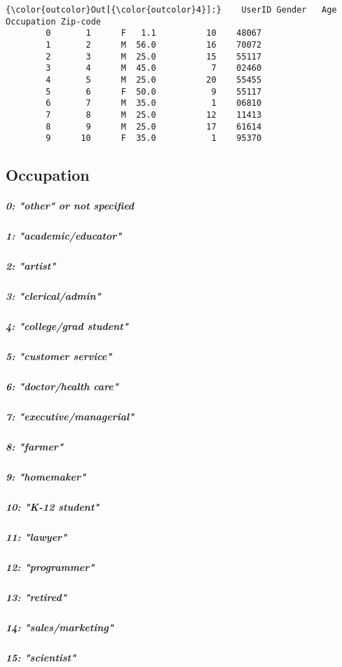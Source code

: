 \documentclass[11pt]{article}
\begin{document}
\begin{Verbatim}[commandchars=\\\{\}]
{\color{outcolor}Out[{\color{outcolor}4}]:}    UserID Gender   Age  Occupation Zip-code
        0       1      F   1.1          10    48067
        1       2      M  56.0          16    70072
        2       3      M  25.0          15    55117
        3       4      M  45.0           7    02460
        4       5      M  25.0          20    55455
        5       6      F  50.0           9    55117
        6       7      M  35.0           1    06810
        7       8      M  25.0          12    11413
        8       9      M  25.0          17    61614
        9      10      F  35.0           1    95370
\end{Verbatim}
            
    \subsection{Occupation}\label{occupation}

\subparagraph{0: "other" or not specified}\label{other-or-not-specified}

\subparagraph{1: "academic/educator"}\label{academiceducator}

\subparagraph{2: "artist"}\label{artist}

\subparagraph{3: "clerical/admin"}\label{clericaladmin}

\subparagraph{4: "college/grad student"}\label{collegegrad-student}

\subparagraph{5: "customer service"}\label{customer-service}

\subparagraph{6: "doctor/health care"}\label{doctorhealth-care}

\subparagraph{7: "executive/managerial"}\label{executivemanagerial}

\subparagraph{8: "farmer"}\label{farmer}

\subparagraph{9: "homemaker"}\label{homemaker}

\subparagraph{10: "K-12 student"}\label{k-12-student}

\subparagraph{11: "lawyer"}\label{lawyer}

\subparagraph{12: "programmer"}\label{programmer}

\subparagraph{13: "retired"}\label{retired}

\subparagraph{14: "sales/marketing"}\label{salesmarketing}

\subparagraph{15: "scientist"}\label{scientist}
\end{document}
